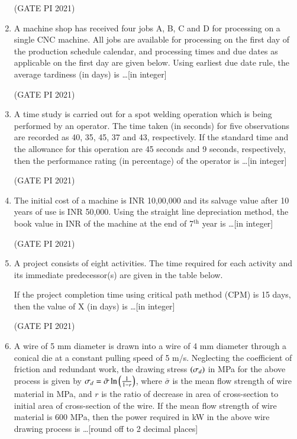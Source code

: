 \documentclass[journal,12pt,onecolumn]{IEEEtran}
\theoremstyle{remark}
\begin{document}
\begin{enumerate}
\hfill (GATE PI 2021)

\item
A machine shop has received four jobs A, B, C and D for processing on a single CNC machine. All jobs are available for processing on the first day of the production schedule calendar, and processing times and due dates as applicable on the first day are given below. Using earliest due date rule, the average tardiness (in days) is \ldots [in integer]



\hfill (GATE PI 2021)

\item
A time study is carried out for a spot welding operation which is being performed by an operator. The time taken (in seconds) for five observations are recorded as 40, 35, 45, 37 and 43, respectively. If the standard time and the allowance for this operation are 45 seconds and 9 seconds, respectively, then the performance rating (in percentage) of the operator is \ldots [in integer]

\hfill (GATE PI 2021)

\item
The initial cost of a machine is INR 10,00,000 and its salvage value after 10 years of use is INR 50,000. Using the straight line depreciation method, the book value in INR of the machine at the end of 7$^\mathrm{th}$ year is \ldots [in integer]

\hfill (GATE PI 2021)

\item
A project consists of eight activities. The time required for each activity and its immediate predecessor(s) are given in the table below.



If the project completion time using critical path method (CPM) is 15 days, then the value of X (in days) is \ldots [in integer]

\hfill (GATE PI 2021)

\item
A wire of 5 mm diameter is drawn into a wire of 4 mm diameter through a conical die at a constant pulling speed of 5 m/s. Neglecting the coefficient of friction and redundant work, the drawing stress $\left(\sigma_d\right)$ in MPa for the above process is given by $\sigma_d = \bar{\sigma} \ln \left(\frac{1}{1-r}\right)$, where $\bar{\sigma}$ is the mean flow strength of wire material in MPa, and $r$ is the ratio of decrease in area of cross-section to initial area of cross-section of the wire. If the mean flow strength of wire material is 600 MPa, then the power required in kW in the above wire drawing process is \ldots [round off to 2 decimal places]


\end{enumerate}
\end{document}

